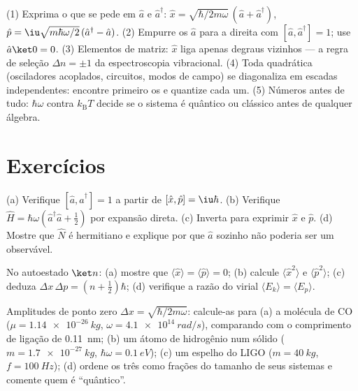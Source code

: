 \begin{method}\label{met:b3:harmonic-oscillator:method}
(1) Exprima o que se pede em $\hat a$ e $\hat a^\dagger$: $\hat x
= \sqrt{\hbar/2m\omega}\,(\hat a + \hat a^\dagger)$, $\hat p =
\iu\sqrt{m\hbar\omega/2}\,(\hat a^\dagger - \hat a)$. (2) Empurre os
$\hat a$ para a direita com $[\hat a, \hat a^\dagger] = 1$; use
$\hat a\ket0 = 0$. (3) Elementos de matriz: $\hat x$ liga apenas
degraus vizinhos --- a regra de seleção $\Delta n = \pm1$ da
espectroscopia vibracional. (4) Toda  quadrática
(osciladores acoplados, circuitos, modos de campo) se diagonaliza em
escadas independentes: encontre primeiro os  e quantize
cada um. (5) Números antes de tudo: $\hbar\omega$ contra
$k_{\text{B}}T$ decide se o sistema é quântico ou clássico antes de
qualquer álgebra.
\end{method}

\section{Exercícios}

\begin{exercise}[$\star$]\label{exo:b3:harmonic-oscillator:1}
(a) Verifique $[\hat a, \hat a^\dagger] = 1$ a partir de $[\hat x, \hat p] =
\iu\hbar$. (b) Verifique $\hat H = \hbar\omega(\hat a^\dagger\hat a +
\tfrac12)$ por expansão direta. (c) Inverta para exprimir $\hat x$ e
$\hat p$. (d) Mostre que $\hat N$ é hermitiano e explique por que
$\hat a$ sozinho não poderia ser um observável.
\end{exercise}

\begin{exercise}[$\star$]\label{exo:b3:harmonic-oscillator:2}
No autoestado $\ket n$: (a) mostre que $\langle\hat x\rangle =
\langle\hat p\rangle = 0$; (b) calcule $\langle\hat x^2\rangle$ e
$\langle\hat p^2\rangle$; (c) deduza $\Delta x\,\Delta p = (n +
\tfrac12)\hbar$; (d) verifique a razão do virial $\langle E_k\rangle =
\langle E_p\rangle$.
\end{exercise}

\begin{exercise}[$\star$]\label{exo:b3:harmonic-oscillator:3}
Amplitudes de ponto zero $\Delta x = \sqrt{\hbar/2m\omega}$: calcule-as
para (a) a molécula de CO ($\mu = \qty{1.14e-26}{kg}$, $\omega =
\qty{4.1e14}{rad/s}$), comparando com o comprimento de ligação de
\qty{0.11}{nm}; (b) um átomo de hidrogênio num sólido ($m =
\qty{1.7e-27}{kg}$, $\hbar\omega = \qty{0.1}{eV}$); (c) um espelho do
LIGO ($m = \qty{40}{kg}$, $f = \qty{100}{Hz}$); (d) ordene os três como
frações do tamanho de seus sistemas e comente quem é ``quântico''.
\end{exercise}

